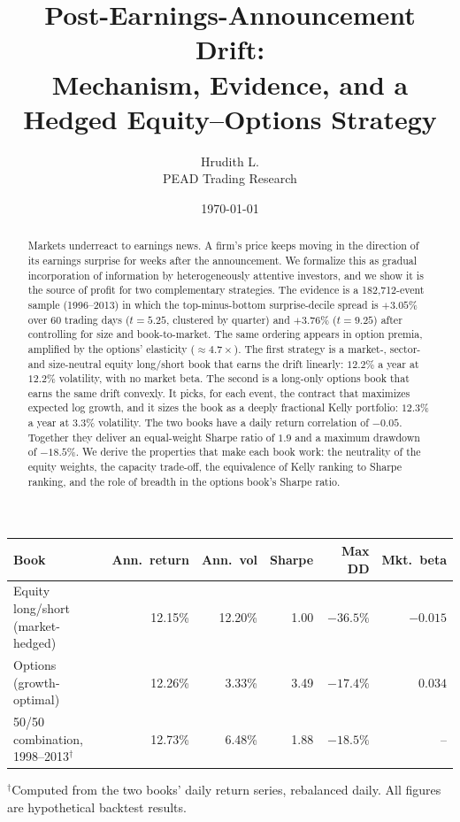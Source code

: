 \documentclass[11pt]{article}
\title{\vspace{-1.2cm}\textbf{Post-Earnings-Announcement Drift:\\[2pt]
Mechanism, Evidence, and a Hedged Equity--Options Strategy}}
\author{Hrudith L.\\[2pt] \small PEAD Trading Research}
\date{\today}
\theoremstyle{definition}
\newcommand{\1}{\mathbf{1}}
\begin{document}
\maketitle
\thispagestyle{empty}

\begin{abstract}
\noindent
Markets underreact to earnings news. A firm's price keeps moving in the direction of its
earnings surprise for weeks after the announcement. We formalize this as gradual
incorporation of information by heterogeneously attentive investors, and we show it is
the source of profit for two complementary strategies. The evidence is a 182{,}712-event
sample (1996--2013) in which the top-minus-bottom surprise-decile spread is $+3.05\%$
over 60 trading days ($t=5.25$, clustered by quarter) and $+3.76\%$ ($t=9.25$) after
controlling for size and book-to-market. The same ordering appears in option premia,
amplified by the options' elasticity ($\approx4.7\times$). The first strategy is a
market-, sector- and size-neutral equity long/short book that earns the drift linearly:
$12.2\%$ a year at $12.2\%$ volatility, with no market beta. The second is a long-only
options book that earns the same drift convexly. It picks, for each event, the contract that
maximizes expected log growth, and it sizes the book as a deeply fractional Kelly portfolio:
$12.3\%$ a year at $3.3\%$ volatility. The two books have a daily return correlation of
$-0.05$. Together they deliver an equal-weight Sharpe ratio of $1.9$ and a maximum drawdown of
$-18.5\%$. We derive the properties that make each book work: the neutrality of the equity
weights, the capacity trade-off, the equivalence of Kelly ranking to Sharpe ranking, and the
role of breadth in the options book's Sharpe ratio.
\end{abstract}

\begin{tcolorbox}[colback=navy!4,colframe=navy,title=\textbf{Summary of results (backtest, 1996--2013, \$10M initial capital, net of modeled costs)},fonttitle=\small,left=4pt,right=4pt,top=3pt,bottom=3pt]
\small
\begin{tabularx}{\linewidth}{@{}Xrrrrr@{}}
\toprule
Book & Ann.\ return & Ann.\ vol & Sharpe & Max DD & Mkt.\ beta \\
\midrule
Equity long/short (market-hedged) & 12.15\% & 12.20\% & 1.00 & $-36.5\%$ & $-0.015$ \\
Options (growth-optimal) & 12.26\% & 3.33\% & 3.49 & $-17.4\%$ & $0.034$ \\
50/50 combination, 1998--2013$^\dagger$ & 12.73\% & 6.48\% & 1.88 & $-18.5\%$ & -- \\
\bottomrule
\end{tabularx}
\vspace{2pt}
{\footnotesize $^\dagger$Computed from the two books' daily return series, rebalanced daily.
All figures are hypothetical backtest results.}
\end{tcolorbox}
\end{document}
